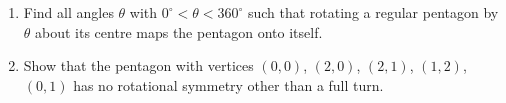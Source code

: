 \begin{enumerate}
\item[(a)] Find all angles $\theta$ with $0^\circ<\theta<360^\circ$ such that rotating a regular pentagon by $\theta$ about its centre maps the pentagon onto itself.
\item[(b)] Show that the pentagon with vertices $(0,0)$, $(2,0)$, $(2,1)$, $(1,2)$, $(0,1)$ has no rotational symmetry other than a full turn.
\end{enumerate}
